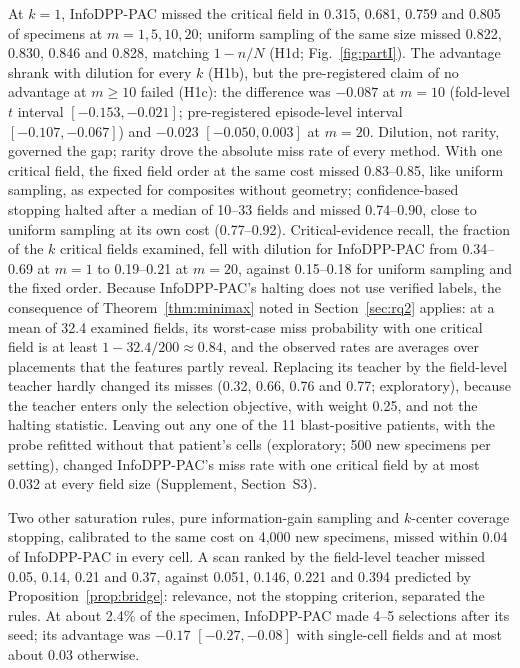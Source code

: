 \documentclass[journal]{IEEEtran}
\begin{document}
At $k=1$, InfoDPP-PAC missed the critical field in 0.315, 0.681, 0.759 and 0.805 of specimens at $m=1,5,10,20$; uniform sampling of the same size missed 0.822, 0.830, 0.846 and 0.828, matching $1-n/N$ (H1d; Fig.~\ref{fig:partI}). The advantage shrank with dilution for every $k$ (H1b), but the pre-registered claim of no advantage at $m\ge10$ failed (H1c): the difference was $-0.087$ at $m=10$ (fold-level $t$ interval $[-0.153,-0.021]$; pre-registered episode-level interval $[-0.107,-0.067]$) and $-0.023$ $[-0.050,0.003]$ at $m=20$. Dilution, not rarity, governed the gap; rarity drove the absolute miss rate of every method. With one critical field, the fixed field order at the same cost missed 0.83--0.85, like uniform sampling, as expected for composites without geometry; confidence-based stopping halted after a median of 10--33 fields and missed 0.74--0.90, close to uniform sampling at its own cost (0.77--0.92). Critical-evidence recall, the fraction of the $k$ critical fields examined, fell with dilution for InfoDPP-PAC from 0.34--0.69 at $m=1$ to 0.19--0.21 at $m=20$, against 0.15--0.18 for uniform sampling and the fixed order. Because InfoDPP-PAC's halting does not use verified labels, the consequence of Theorem~\ref{thm:minimax} noted in Section~\ref{sec:rq2} applies: at a mean of 32.4 examined fields, its worst-case miss probability with one critical field is at least $1-32.4/200\approx0.84$, and the observed rates are averages over placements that the features partly reveal. Replacing its teacher by the field-level teacher hardly changed its misses (0.32, 0.66, 0.76 and 0.77; exploratory), because the teacher enters only the selection objective, with weight 0.25, and not the halting statistic. Leaving out any one of the 11 blast-positive patients, with the probe refitted without that patient's cells (exploratory; 500 new specimens per setting), changed InfoDPP-PAC's miss rate with one critical field by at most 0.032 at every field size (Supplement, Section~S3).

Two other saturation rules, pure information-gain sampling and $k$-center coverage stopping, calibrated to the same cost on 4,000 new specimens, missed within 0.04 of InfoDPP-PAC in every cell. A scan ranked by the field-level teacher missed 0.05, 0.14, 0.21 and 0.37, against 0.051, 0.146, 0.221 and 0.394 predicted by Proposition~\ref{prop:bridge}: relevance, not the stopping criterion, separated the rules. At about 2.4\% of the specimen, InfoDPP-PAC made 4--5 selections after its seed; its advantage was $-0.17$ $[-0.27,-0.08]$ with single-cell fields and at most about 0.03 otherwise.
\end{document}
